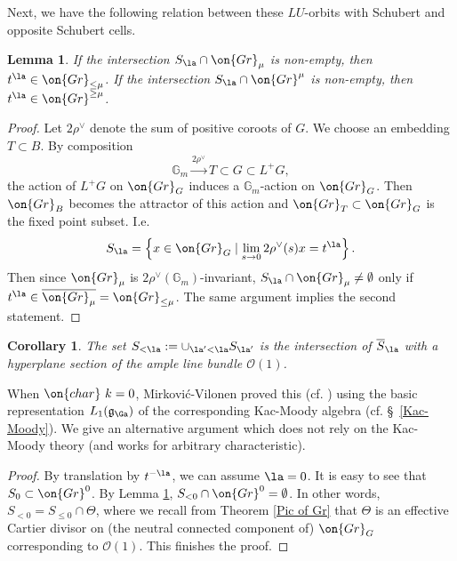 \documentclass[]{pcmi}
\theoremstyle{plain}
\newtheorem{lem}[equation]{Lemma}
\newtheorem{cor}[equation]{Corollary}
\theoremstyle{remark}
\theoremstyle{definition}
\newcommand{\frakg}{{\mathfrak g}}
\newcommand{\bG}{{\mathbb G}}
\newcommand{\mO}{{\mathcal O}}
\newcommand{\cha}{{\on{char}}}
\newcommand{\Gr}{{\on{Gr}}}
\begin{document}
Next, we have the following relation between these $LU$-orbits with Schubert and opposite Schubert cells.
\begin{lem}\label{intersection of semi and Sch}
If the intersection $S_\la \cap \Gr_\mu$ is non-empty, then $t^\la\in \Gr_{\leq \mu}$. If the intersection $S_\la\cap \Gr^{\mu}$ is non-empty, then $t^\la\in \Gr^{\geq \mu}$.
\end{lem}
\begin{proof}Let $2\rho^\vee$ denote the sum of positive coroots of $G$. We choose an embedding $T\subset B$. By composition
\[\bG_m\stackrel{2\rho^\vee}{\to} T\subset G\subset L^+G,\]
the action of $L^+G$ on $\Gr_G$ induces a $\bG_m$-action on $\Gr_G$. Then $\Gr_B$ becomes the attractor of this action and $\Gr_T\subset \Gr_G$ is the fixed point subset. I.e. 
$$S_\la=\left\{x\in \Gr_G\mid \lim\limits_{s\to 0}2\rho^\vee(s)x=t^\la\right\}.$$
Then since $\Gr_\mu$ is $2\rho^\vee(\bG_m)$-invariant, $S_\la\cap \Gr_\mu\neq\emptyset$ only if $t^\la\in \overline{\Gr_\mu}=\Gr_{\leq \mu}$. The same argument implies the second statement.
\end{proof}
\begin{cor}\label{boundary of semi}
The set $S_{<\la}:=\cup_{\la'<\la} S_{\la'}$ is the intersection of $\overline{S}_\la$ with a hyperplane section of the ample line bundle $\mO(1)$.
\end{cor}
When $\cha\ k=0$, Mirkovi\'c-Vilonen proved this (cf. \cite[Proposition 3.1(b)]{MV}) using the basic representation $L_1(\frakg_\Ga)$ of the corresponding Kac-Moody algebra (cf. \S~\ref{Kac-Moody}). We give an alternative argument which does not rely on the Kac-Moody theory (and works for arbitrary characteristic).
\begin{proof} By translation by $t^{-\la}$, we can assume $\la=0$. It is easy to see that $S_0\subset \Gr^0$. By Lemma \ref{intersection of semi and Sch}, $S_{<0}\cap \Gr^0=\emptyset$. In other words, $S_{<0}=S_{\leq 0}\cap \Theta$, where we recall from Theorem \ref{Pic of Gr} that $\Theta$ is an effective Cartier divisor on (the neutral connected component of) $\Gr_G$ corresponding to $\mO(1)$.  This finishes the proof.
\end{proof}
\end{document}
